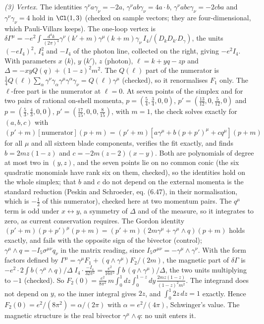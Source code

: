 \emph{(3) Vertex.} The identities $\gamma^{\nu}a\gamma_{\nu} = -2a$, $\gamma^{\nu}ab\gamma_{\nu} = 4a\cdot b$, $\gamma^{\nu}abc\gamma_{\nu} = -2cba$ and $\gamma^{\nu}\gamma_{\nu} = 4$ hold in $\Cl(1,3)$ (checked on sample vectors; they are four-dimensional, which Pauli-Villars keeps). The one-loop vertex is $\delta\Gamma^{\mu} = -e^{2}\int\frac{d^{4}k}{(2\pi)^{4}}\gamma^{\nu}(k'+m)\gamma^{\mu}(k+m)\gamma_{\nu}\,I_{4}/(D_{k}D_{k'}D_{\gamma})$, the units $(-eI_{4})^{2}$, $I_{4}^{2}$ and $-I_{4}$ of the photon line, collected on the right, giving $-e^{2}I_{4}$. With parameters $x$ ($k$), $y$ ($k'$), $z$ (photon), $\ell = k + yq - zp$ and $\Delta = -xyQ(q) + (1-z)^{2}m^{2}$. The $Q(\ell)$ part of the numerator is $\tfrac14 Q(\ell)\sum_{\alpha}\gamma^{\nu}\gamma_{\alpha}\gamma^{\mu}\gamma^{\alpha}\gamma_{\nu} = Q(\ell)\gamma^{\mu}$ (checked), so it renormalises $F_{1}$ only. The $\ell$-free part is the numerator at $\ell = 0$. At seven points of the simplex and for two pairs of rational on-shell momenta, $p = (\tfrac54, \tfrac34, 0, 0)$, $p' = (\tfrac{13}{12}, 0, \tfrac{5}{12}, 0)$ and $p = (\tfrac53, \tfrac43, 0, 0)$, $p' = (\tfrac{17}{15}, 0, 0, \tfrac{8}{15})$, with $m = 1$, the check solves exactly for $(a, b, c)$ with $(p'+m)[\text{numerator}](p+m) = (p'+m)[a\gamma^{\mu} + b(p+p')^{\mu} + cq^{\mu}](p+m)$ for all $\mu$ and all sixteen blade components, verifies the fit exactly, and finds $b = 2mz(1-z)$ and $c = -2m(z-2)(x-y)$. Both are polynomials of degree at most two in $(y, z)$, and the seven points lie on no common conic (the six quadratic monomials have rank six on them, checked), so the identities hold on the whole simplex; that $b$ and $c$ do not depend on the external momenta is the standard reduction (Peskin and Schroeder, eq. (6.47), in their normalisation, which is $-\tfrac12$ of this numerator), checked here at two momentum pairs. The $q^{\mu}$ term is odd under $x \leftrightarrow y$, a symmetry of $\Delta$ and of the measure, so it integrates to zero, as current conservation requires. The Gordon identity $(p'+m)(p+p')^{\mu}(p+m) = (p'+m)(2m\gamma^{\mu} + \gamma^{\mu}\wedge q)(p+m)$ holds exactly, and fails with the opposite sign of the bivector (control); $\gamma^{\mu}\wedge q = -I_{5}\sigma^{\mu\nu}q_{\nu}$ in the matrix reading, since $I_{5}\sigma^{\mu\nu} = -\gamma^{\mu}\wedge\gamma^{\nu}$. With the form factors defined by $\Gamma^{\mu} = \gamma^{\mu}F_{1} + (q\wedge\gamma^{\mu})F_{2}/(2m)$, the magnetic part of $\delta\Gamma$ is $-e^{2}\cdot 2\int b(\gamma^{\mu}\wedge q)/\Delta\;I_{4}\cdot\frac{-I_{4}}{32\pi^{2}} = \frac{e^{2}}{16\pi^{2}}\int b\,(q\wedge\gamma^{\mu})/\Delta$, the two units multiplying to $-1$ (checked). So $F_{2}(0) = \frac{e^{2}}{8\pi^{2}}\,m\int_{0}^{1}dz\int_{0}^{1-z}dy\,\frac{2mz(1-z)}{(1-z)^{2}m^{2}}$. The integrand does not depend on $y$, so the inner integral gives $2z$, and $\int_{0}^{1}2z\,dz = 1$ exactly. Hence $F_{2}(0) = e^{2}/(8\pi^{2}) = \alpha/(2\pi)$ with $\alpha = e^{2}/(4\pi)$, Schwinger's value. The magnetic structure is the real bivector $\gamma^{\mu}\wedge q$: no unit enters it.


